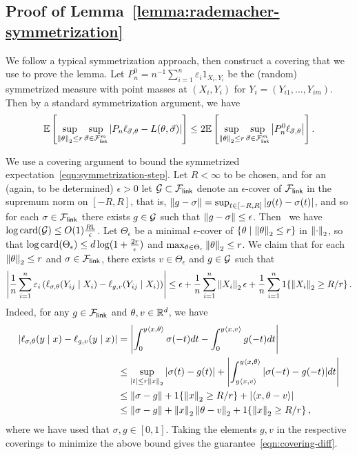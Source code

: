 \subsection{Proof of Lemma~\ref{lemma:rademacher-symmetrization}} \label{proof:rademacher-symmetrization}
We follow a typical symmetrization approach, then construct a covering
that we use to prove the lemma.
Let $P_n^0 = n^{-1} \sum_{i = 1}^n \varepsilon_i 1_{X_i, Y_i}$ be the
(random) symmetrized measure with point masses at $(X_i, Y_i)$ for
$Y_i = (Y_{i1}, \ldots, Y_{im})$. Then by a standard symmetrization
argument, we have
\begin{equation}
	\label{eqn:symmetrization-step}
	\mathbb{E}\left[\sup_{\left\|{\theta}\right\|_2 \le r}
	\sup_{\vec{\sigma} \in \mathcal{F}_{\mathsf{link}}^m} |P_n \ell_{\vec{\sigma},\theta} - L(\theta,
	\vec{\sigma})|\right]
	\le 2 \mathbb{E}\left[\sup_{\left\|{\theta}\right\|_2 \le r}
	\sup_{\vec{\sigma} \in \mathcal{F}_{\mathsf{link}}^m} \left|P_n^0 \ell_{\vec{\sigma}, \theta}
	\right|\right].
\end{equation}

We use a covering argument to bound the symmetrized
expectation~\eqref{eqn:symmetrization-step}.  Let $R < \infty$ to be
chosen, and for an (again, to be determined) $\epsilon > 0$ let $\mathcal{G}
\subset \mathcal{F}_{\mathsf{link}}$
denote an $\epsilon$-cover of $\mathcal{F}_{\mathsf{link}}$ in the supremum norm on $[-R, R]$,
that is, $\left\|{g - \sigma}\right\| = \sup_{t \in [-R,R]} |g(t) - \sigma(t)|$, and
so for each $\sigma \in \mathcal{F}_{\mathsf{link}}$ there exists $g \in \mathcal{G}$ such that
$\left\|{g - \sigma}\right\| \le \epsilon$. Then~\cite[Ch.~2.7]{VanDerVaartWe96} we
have $\log \textup{card}(\mathcal{G}) \le O(1) \frac{R \mathsf{L}}{\epsilon}$. Let
$\Theta_\epsilon$ be a minimal $\epsilon$-cover of $\{\theta \mid
\left\|{\theta}\right\|_2 \le r\}$ in $\left\|{\cdot}\right\|_2$, so that $\log
\textup{card}(\Theta_\epsilon) \le d \log(1 + \frac{2r}{\epsilon})$
and $\max_{\theta \in \Theta_\epsilon} \left\|{\theta}\right\|_2 \le r$.
We claim that for each $\left\|{\theta}\right\|_2 \le r$ and $\sigma
\in \mathcal{F}_{\mathsf{link}}$, there exists
$v \in \Theta_\epsilon$ and $g \in \mathcal{G}$ such that
\begin{equation}
	\left|\frac{1}{n} \sum_{i = 1}^n \varepsilon_i
	\left(\ell_{\sigma, \theta}(Y_{ij} \mid X_i)
	-
	\ell_{g, v}(Y_{ij} \mid X_i)\right)
	\right|
	\le \epsilon +
	\frac{1}{n}\sum_{i = 1}^n \left\|{X_i}\right\|_2 \epsilon
	+ \frac{1}{n} \sum_{i = 1}^n1\!\left\{{\left\|{X_i}\right\|_2 \ge R / r}\right\}.
	\label{eqn:covering-diff}
\end{equation}
Indeed, for any $g \in \mathcal{F}_{\mathsf{link}}$ and $\theta, v \in \mathbb{R}^d$, we have
\begin{align*}
	\left|\ell_{\sigma, \theta}(y \mid x)
	- \ell_{g, v}(y \mid x)\right|
	& = \left|\int_0^{y \langle x, \theta\rangle} \sigma(-t) dt
	- \int_0^{y \langle x, v\rangle} g(-t) dt\right| \\
	& \le \sup_{|t| \le r \left\|{x}\right\|_2} |\sigma(t) - g(t)|
	+ \left|\int_{y\langle x, v\rangle}^{y\langle x, \theta\rangle}
	|\sigma(-t) - g(-t)| dt \right| \\
	& \le \left\|{\sigma - g}\right\| + 1\!\left\{{\left\|{x}\right\|_2 \ge R/r}\right\}
	+ |\langle x, \theta - v\rangle| \\
	& \le
	\left\|{\sigma - g}\right\| + \left\|{x}\right\|_2 \left\|{\theta - v}\right\|_2
	+ 1\!\left\{{\left\|{x}\right\|_2 \ge R/r}\right\},
\end{align*}
where we have used that $\sigma, g \in [0, 1]$.
Taking the elements $g, v$ in the respective coverings to minimize
the above bound gives the guarantee~\eqref{eqn:covering-diff}.

